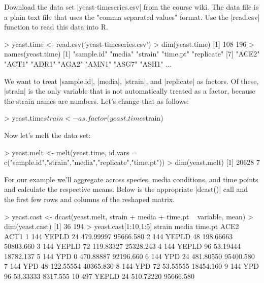 Download the data set |yeast-timeseries.csv| from the course wiki. The data file is a plain text file that uses the "comma separated values" format. Use the |read.csv| function to read this data into R.
%
\begin{R}
> yeast.time <- read.csv('yeast-timeseries.csv')
> dim(yeast.time)
[1] 108 196
> names(yeast.time)
  [1] "sample.id"  "media"  "strain"  "time.pt"   "replicate"  
  [7]  "ACE2"  "ACT1"  "ADR1"  "AGA2"  "AMN1"  "ASG7"  "ASH1" 
...
\end{R}

We want to treat |sample.id|, |media|, |strain|, and |replicate| as factors.   Of these, |strain| is the only variable that is not automatically treated as a factor, because the strain names are numbers. Let's change that as follows:
%
\begin{R}
> yeast.time$strain <- as.factor(yeast.time$strain)
\end{R}
%

Now let's melt the data set:
%
\begin{R}
> yeast.melt <- melt(yeast.time, 
        id.vars = c("sample.id","strain","media","replicate","time.pt"))
> dim(yeast.melt)
[1] 20628     7
\end{R}
%
For our example we'll aggregate across species, media conditions, and time points and calculate the respective means.  Below is the appropriate |dcast()| call and the first few rows and columns of the reshaped matrix.
%
\begin{R}
> yeast.cast <- dcast(yeast.melt, strain + media + time.pt ~ variable, mean)
> dim(yeast.cast)
[1]  36 194
> yeast.cast[1:10,1:5]
   strain media time.pt      ACE2      ACT1
1     144 YEPLD      24 479.99997 95666.580
2     144 YEPLD      48 198.66663 50803.660
3     144 YEPLD      72 119.83327 25328.243
4     144 YEPLD      96  53.19444 18782.137
5     144   YPD       0 470.88887 92196.660
6     144   YPD      24 481.80550 95400.580
7     144   YPD      48 122.55554 40365.830
8     144   YPD      72  53.55555 18454.160
9     144   YPD      96  53.33333  8317.555
10    497 YEPLD      24 510.72220 95666.580
\end{R}

